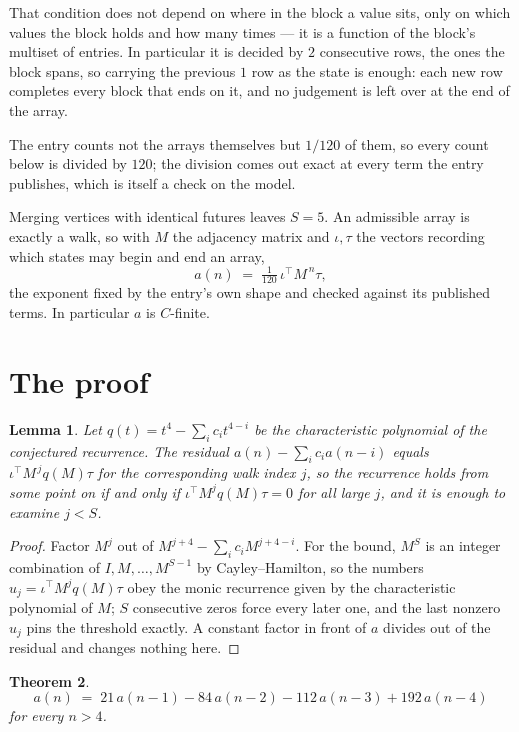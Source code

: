 \documentclass[11pt,a4paper]{article}
\theoremstyle{plain}
\newtheorem{theorem}{Theorem}
\newtheorem{lemma}[theorem]{Lemma}
\theoremstyle{definition}
\begin{document}
That condition does not depend on where in the block a value sits, only on which values the block holds and how many times --- it is a function of the block's multiset of entries. In particular it is decided by $2$ consecutive rows, the ones the block spans, so carrying the previous $1$ row as the state is enough: each new row completes every block that ends on it, and no judgement is left over at the end of the array.

The entry counts not the arrays themselves but $1/120$ of them, so every count below is divided by $120$; the division comes out exact at every term the entry publishes, which is itself a check on the model.

Merging vertices with identical futures leaves $S=5$. An admissible array is exactly a walk, so with $M$ the adjacency matrix and $\iota,\tau$ the vectors recording which states may begin and end an array,
\[
a(n)\;=\;\tfrac{1}{120}\,\iota^{\!\top}M^{\,n}\tau ,
\]
the exponent fixed by the entry's own shape and checked against its published terms. In
particular $a$ is $C$-finite.

\section{The proof}

\begin{lemma}\label{lem:crit}
Let $q(t)=t^{4}-\sum_i c_it^{4-i}$ be the characteristic polynomial of the
conjectured recurrence. The residual $a(n)-\sum_ic_ia(n-i)$ equals
$\iota^{\!\top}M^{\,j}q(M)\tau$ for the corresponding walk index $j$, so the recurrence
holds from some point on if and only if $\iota^{\!\top}M^{j}q(M)\tau=0$ for all large $j$,
and it is enough to examine $j<S$.
\end{lemma}

\begin{proof}
Factor $M^{j}$ out of $M^{j+4}-\sum_ic_iM^{j+4-i}$. For the bound, $M^{S}$
is an integer combination of $I,M,\dots,M^{S-1}$ by Cayley--Hamilton, so the numbers
$u_j=\iota^{\!\top}M^{j}q(M)\tau$ obey the monic recurrence given by the characteristic
polynomial of $M$; $S$ consecutive zeros force every later one, and the last nonzero $u_j$
pins the threshold exactly. A constant factor in front of $a$ divides out of the residual and
changes nothing here.
\end{proof}

\begin{theorem}
\[
a(n)\;=\;21\,a(n-1) - 84\,a(n-2) - 112\,a(n-3) + 192\,a(n-4)
\]
for every $n>4$.
\end{theorem}
\end{document}
